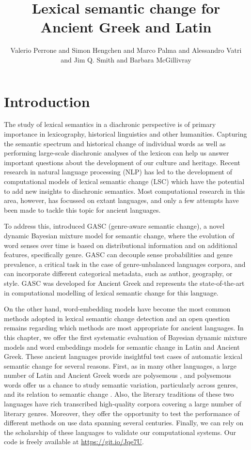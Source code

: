 \documentclass[output=paper%
]{langscibook}
\author{Valerio Perrone\affiliation{Amazon} and
Simon Hengchen\affiliation{University of Gothenburg} and
Marco Palma\orcid{0000-0003-0497-9001}\affiliation{University of Warwick} and
Alessandro Vatri\affiliation{University of Oxford} and
Jim Q. Smith\affiliation{University of Warwick; The Alan Turing Institute} and
Barbara McGillivray\affiliation{University of Cambridge; The Alan Turing Institute}}
\title{Lexical semantic change for Ancient Greek and Latin}
\begin{document}
\maketitle


\section{Introduction}

The study of lexical semantics in a diachronic perspective is of primary importance in lexicography, historical linguistics and other humanities. 
Capturing the semantic spectrum and historical change of individual words as well as performing large-scale diachronic analyses of the lexicon  can help us answer important questions about the development of our culture and heritage. 
Recent research in natural language processing (NLP) has led to the development of computational models of lexical semantic change (LSC) which have the potential to add new insights to diachronic semantics. Most computational research in this area, however, has focussed on extant languages, and only a few attempts have been made to tackle this topic for ancient languages. 


To address this, \citet{perrone-etal-2019-gasc} introduced GASC (genre-aware semantic change), a novel dynamic Bayesian mixture model for semantic change, where the evolution of word senses over time is based on distributional information and on additional features, specifically genre. GASC can decouple sense probabilities and genre prevalence, a critical task in the case of genre-unbalanced languages corpora, 
and can incorporate different categorical metadata, such as author, geography, or style. GASC was developed for Ancient Greek and represents the state-of-the-art in computational modelling of lexical semantic change for this language. 

On the other hand, word-embedding models have become the most common methods adopted in lexical semantic change detection \citep{kutuzov-etal-2018-diachronic} and an open question remains regarding which methods are most appropriate for ancient languages. 
In this chapter, we offer the first systematic evaluation of Bayesian dynamic mixture models and word embeddings models for semantic change in Latin and Ancient Greek.
These ancient languages provide insightful test cases of automatic lexical semantic change for several reasons. First, as in many other languages, a large number of Latin and Ancient Greek words are polysemous \citep{bakker_register_2010}, and polysemous words offer us a chance to study semantic variation, particularly across genres, and its relation to semantic change \citep{leiwoetal2012}. 
Also, the literary traditions of these two languages have rich transcribed high-quality corpora covering a large number of literary genres. Moreover, they offer the opportunity to test the performance of different methods on use data spanning several centuries. Finally, we can rely on the scholarship of these languages to validate our computational systems.
Our code is freely available at \url{https://git.io/Jqe7U}.
\end{document}
